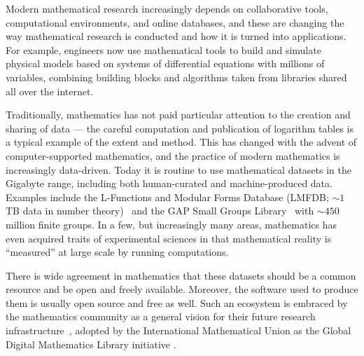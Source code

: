 
Modern mathematical research increasingly depends on collaborative tools, computational environments, and online databases, and these are changing the way mathematical research is conducted and how it is turned into applications.
For example, engineers now use mathematical tools to build and simulate physical models based on systems of differential equations with millions of variables, combining building blocks and algorithms taken from libraries shared all over the internet.

Traditionally, mathematics has not paid particular attention to the creation and sharing of data --- the careful computation and publication of logarithm tables is a typical example of the extent and method.
This has changed with the advent of computer-supported mathematics, and the practice of modern mathematics is increasingly data-driven.
Today it is routine to use mathematical datasets in the Gigabyte range, including both human-curated and machine-produced data.
Examples include the L-Functions and Modular Forms Database (LMFDB; $\sim 1$ TB data in number theory)~\cite{Cremona:LMFDB16,lmfdb:on} and the GAP Small Groups Library~\cite{GapSmallGroups:on} with $\sim 450$ million finite groups.  
In a few, but increasingly many areas, mathematics has even acquired traits of experimental sciences in that mathematical reality is ``measured'' at large scale by running computations.

There is wide agreement in mathematics that these datasets should be a common resource and be open and freely available.
Moreover, the software used to produce them is usually open source and free as well.
Such an ecosystem is embraced by the mathematics community as a general vision for their future research infrastructure~\cite{NAS14}, adopted by the International Mathematical Union as the Global Digital Mathematics Library initiative \cite{GDML:on}.

